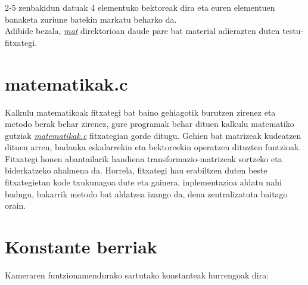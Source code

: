 \documentclass[12pt]{article}
\newcommand{\fitxategi}[1] {\underline{\textit{#1}}}
\begin{document}
2-5 zenbakidun datuak 4 elementuko bektoreak dira eta euren elementuen banaketa zuriune batekin markatu beharko da.\\

Adibide bezala, \fitxategi{mat} direktorioan daude pare bat material adierazten duten testu-fitxategi.


\section{matematikak.c}\label{matematikak}

Kalkulu matematikoak fitxategi bat baino gehiagotik burutzen zirenez eta metodo berak behar zirenez, gure programak behar dituen kalkulu matematiko gutziak \fitxategi{matematikak.c} fitxategian gorde ditugu. Gehien bat matrizeak kudeatzen dituen arren, badauka eskalarrekin eta bektoreekin operatzen dituzten funtzioak.\\

Fitxategi honen abantailarik handiena transformazio-matrizeak sortzeko eta biderkatzeko ahalmena da. Horrela, fitxategi hau erabiltzen duten beste fitxategietan kode txukunagoa dute eta gainera, inplementazioa aldatu nahi badugu, bakarrik metodo bat aldatzea izango da, dena zentralizatuta baitago orain.

\pagebreak

\section{Konstante berriak}\label{constants}

Kameraren funtzionamendurako sartutako konstanteak hurrengoak dira:
\end{document}
